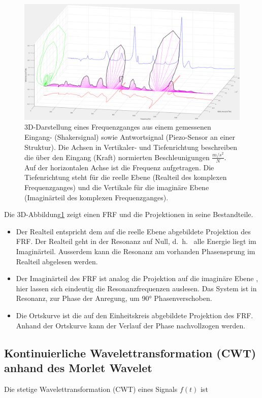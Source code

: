 \begin{figure}
	\centering
	\includegraphics[width=\textwidth]{papers/wavelets/images/4_FRF_iso.png}
	\caption{3D-Darstellung eines Frequenzganges aus einem gemessenen Eingang- (Shakersignal) sowie Antwortsignal (Piezo-Sensor an einer Struktur). Die Achsen in Vertikaler- und Tiefenrichtung beschreiben die über den Eingang (Kraft) normierten Beschleunigungen $\frac{m/s^2}{N}$. Auf der horizontalen Achse ist die Frequenz aufgetragen. Die Tiefenrichtung steht für die reelle Ebene (Realteil des komplexen Frequenzganges) und die Vertikale für die imaginäre Ebene (Imaginärteil des komplexen Frequenzganges).}
	\label{wavelet:fig:FRF_iso}
\end{figure}

Die 3D-Abbildung\ref{wavelet:fig:FRF_iso} zeigt einen FRF und die Projektionen in seine Bestandteile.

\begin{itemize}
	\item Der Realteil entspricht dem auf die reelle Ebene abgebildete Projektion des FRF. Der Realteil geht in der Resonanz auf Null, d.~h.~ alle Energie liegt im Imaginärteil. Ausserdem kann die Resonanz am vorhanden Phasensprung im Realteil abgelesen werden.
	\item Der Imaginärteil des FRF ist analog die Projektion auf die imaginäre Ebene , hier lassen sich eindeutig die Resonanzfrequenzen auslesen. Das System ist in Resonanz, zur Phase der Anregung, um 90° Phasenverschoben.
	\item Die Ortskurve ist die auf den Einheitskreis abgebildete Projektion des FRF. Anhand der Ortskurve kann der Verlauf der Phase nachvollzogen werden.
\end{itemize}

\subsection{Kontinuierliche Wavelettransformation (CWT) anhand des Morlet Wavelet
	\label{wavelets:subsection:CWT}}
Die stetige Wavelettransformation (CWT) eines Signals $f(t)$ ist \cite{H.Burkhardt.2020}

